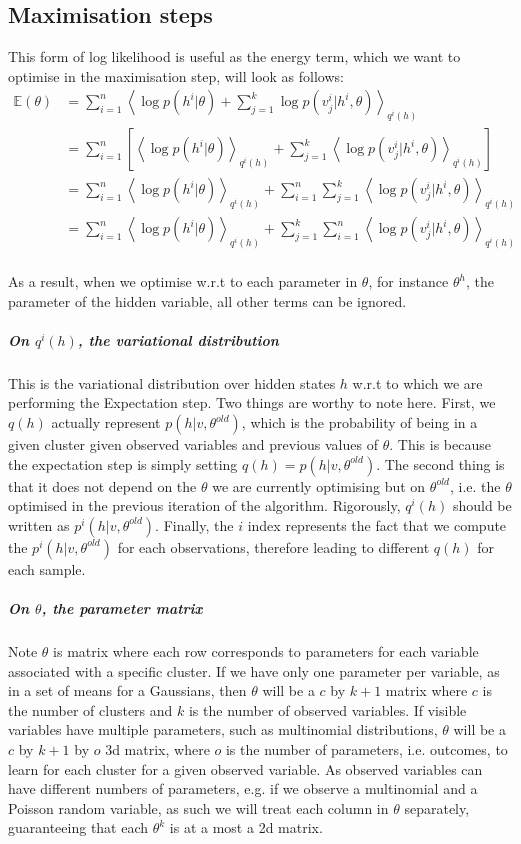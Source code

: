 \documentclass[]{article}
\begin{document}
\subsection{Maximisation steps}
This form of log likelihood is useful as the energy term, which we want to optimise in the maximisation step, will look as follows:
\begin{align*}
	\mathbb{E}(\theta) &= \sum_{i=1}^{n} \left\langle \log p(h^i|\theta) +  \sum_{j=1}^{k} \log p(v_j^i|h^i, \theta) \right\rangle_{q^i(h)} \\
	&= \sum_{i=1}^{n} \left[ \left\langle \log p(h^i|\theta) \right\rangle_{q^i(h)}  +  \sum_{j=1}^{k} \left\langle \log p(v_j^i|h^i, \theta) \right\rangle_{q^i(h)}  \right] \\
	&= \sum_{i=1}^{n}  \left\langle \log p(h^i|\theta) \right\rangle_{q^i(h)}   + \sum_{i=1}^{n}  \sum_{j=1}^{k} \left\langle \log p(v_j^i|h^i, \theta) \right\rangle_{q^i(h)}  \\
	&= \sum_{i=1}^{n} \left\langle \log p(h^i|\theta) \right\rangle_{q^i(h)}  + \sum_{j=1}^{k}  \sum_{i=1}^{n}  \left\langle \log p(v_j^i|h^i, \theta) \right\rangle_{q^i(h)} \\
\end{align*}

As a result, when we optimise w.r.t to each parameter in $\theta$, for instance $\theta^h$, the parameter of the hidden variable, all other terms can be ignored. 

\subparagraph{On $q^i(h)$, the variational distribution} This is the variational distribution over hidden states $h$ w.r.t to which we are performing the Expectation step. Two things are worthy to note here. First, we $q(h)$ actually represent $p(h|v, \theta^{old})$, which is the probability of being in a given cluster given observed variables and previous values of $\theta$. This is because the expectation step is simply setting $q(h) = p(h|v, \theta^{old})$. The second thing is that it does not depend on the $\theta$ we are currently optimising but on $\theta^{old}$, i.e. the $\theta$ optimised in the previous iteration of the algorithm. Rigorously, $q^i(h)$ should be written as $p^i(h|v, \theta^{old})$. Finally, the $i$ index represents the fact that we compute the $p^i(h|v, \theta^{old})$ for each observations, therefore leading to different $q(h)$ for each sample. 

\subparagraph{On $\theta$, the parameter matrix} Note $\theta$ is matrix where each row corresponds to parameters for each variable associated with a specific cluster. If we have only one parameter per variable, as in a set of means for a Gaussians, then $\theta$ will be a $c$ by $k+1$ matrix where $c$ is the number of clusters and $k$ is the number of observed variables. If visible variables have multiple parameters, such as multinomial distributions, $\theta$ will be a $c$ by $k+1$ by $o$ 3d matrix, where $o$ is the number of parameters, i.e. outcomes, to learn for each cluster for a given observed variable. As observed variables can have different numbers of parameters, e.g. if we observe a multinomial and a Poisson random variable, as such we will treat each column in $\theta$ separately, guaranteeing that each $\theta^k$ is at a most a 2d matrix. \\
\end{document}
